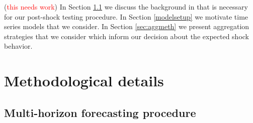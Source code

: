 \documentclass[11pt]{article}
\theoremstyle{definition}
\begin{document}
(\textcolor{red}{this needs work}) In Section \ref{sec:multhor} we discuss the background in \cite{quaedvlieg2021multi} that is necessary for our post-shock testing procedure. In Section \ref{modelsetup} we motivate time series models that we consider. In Section \ref{sec:aggmeth} we present aggregation strategies that we consider which inform our decision about the expected shock behavior.

\section{Methodological details}

\subsection{Multi-horizon forecasting procedure}
\label{sec:multhor}
\end{document}
